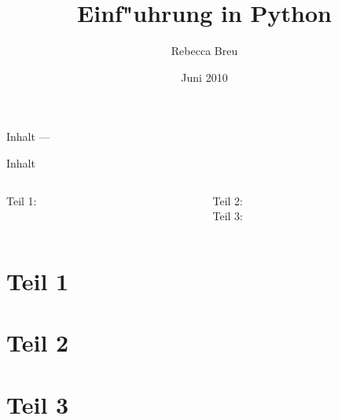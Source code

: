 \documentclass{beamer}
\title{Einf"uhrung in Python}
\date{Juni 2010}
\author{Rebecca Breu}
\institute
{
 Verteilte Systeme und Grid-Computing \\
 JSC\\
 Forschungszentrum J"ulich
}
\begin{document}
\AtBeginPart
{
  \begin{frame}
  \titlepage
  \end{frame}

  \begin{frame}{Inhalt --- \insertpart}
  \tableofcontents
  \end{frame}
}


\AtBeginSection[]
{
   \begin{frame}{\insertsection}
       \tableofcontents[currentsection]
   \end{frame}
}


\begin{frame}
\titlepage
\end{frame}

\begin{frame}{Inhalt}
\begin{columns}[t]

\begin{column}{0.4\textwidth}
  Teil 1:\\[3mm]
  \tableofcontents[part=1]
\end{column}

\begin{column}{0.6\textwidth}
  Teil 2:\\[3mm]
  \tableofcontents[part=2]
  \vspace{7mm}
  Teil 3:\\[3mm]
  \tableofcontents[part=3]
\end{column}

\end{columns}
\end{frame}


\part{Teil 1}









\vielspass

\part{Teil 2}



%
%

\vielspass

\part{Teil 3}




\vielspass
\end{document}
